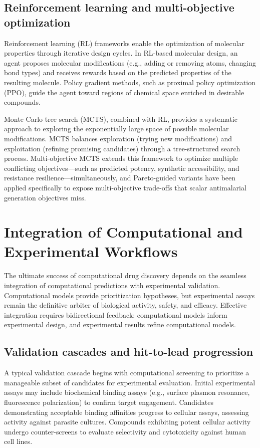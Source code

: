 \subsection{Reinforcement learning and multi-objective optimization}

Reinforcement learning (RL) frameworks enable the optimization of molecular properties through iterative design cycles. In RL-based molecular design, an agent proposes molecular modifications (e.g., adding or removing atoms, changing bond types) and receives rewards based on the predicted properties of the resulting molecule. Policy gradient methods, such as proximal policy optimization (PPO), guide the agent toward regions of chemical space enriched in desirable compounds.

Monte Carlo tree search (MCTS), combined with RL, provides a systematic approach to exploring the exponentially large space of possible molecular modifications. MCTS balances exploration (trying new modifications) and exploitation (refining promising candidates) through a tree-structured search process. Multi-objective MCTS extends this framework to optimize multiple conflicting objectives—such as predicted potency, synthetic accessibility, and resistance resilience—simultaneously, and Pareto-guided variants have been applied specifically to expose multi-objective trade-offs that scalar antimalarial generation objectives miss\cite{Temgoua2026Pareto}.

\section{Integration of Computational and Experimental Workflows}

The ultimate success of computational drug discovery depends on the seamless integration of computational predictions with experimental validation. Computational models provide prioritization hypotheses, but experimental assays remain the definitive arbiter of biological activity, safety, and efficacy. Effective integration requires bidirectional feedback: computational models inform experimental design, and experimental results refine computational models.

\subsection{Validation cascades and hit-to-lead progression}

A typical validation cascade begins with computational screening to prioritize a manageable subset of candidates for experimental evaluation. Initial experimental assays may include biochemical binding assays (e.g., surface plasmon resonance, fluorescence polarization) to confirm target engagement. Candidates demonstrating acceptable binding affinities progress to cellular assays, assessing activity against parasite cultures. Compounds exhibiting potent cellular activity undergo counter-screens to evaluate selectivity and cytotoxicity against human cell lines.

